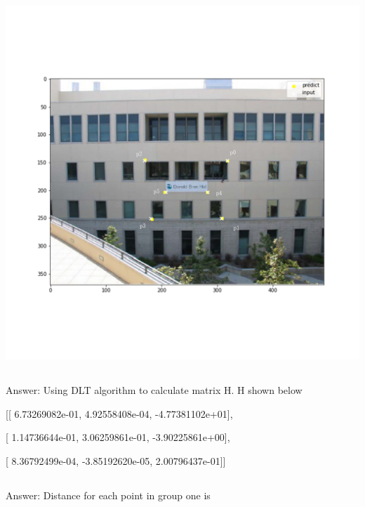 \documentclass[]{article}
\begin{document}
\includegraphics[width=\textwidth]{afterdlt.png}\\

\subsection{}
Answer: Using DLT algorithm to calculate matrix H. H shown below

[[ 6.73269082e-01,  4.92558408e-04, -4.77381102e+01],

[ 1.14736644e-01,  3.06259861e-01, -3.90225861e+00],

[ 8.36792499e-04, -3.85192620e-05,  2.00796437e-01]]

\subsection{}
Answer: Distance for each point in group one is
\end{document}
